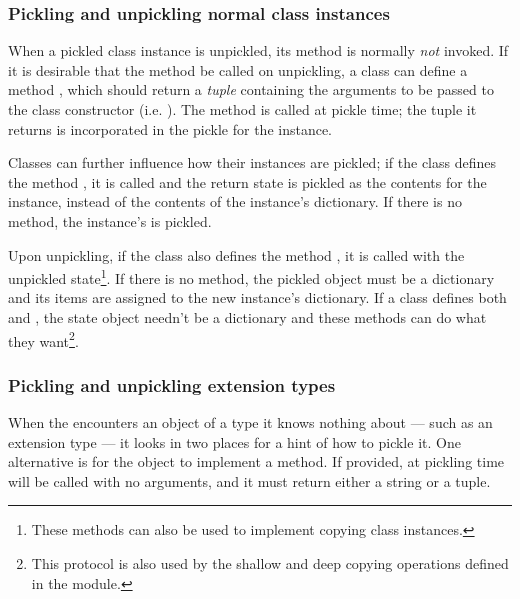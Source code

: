 \subsubsection{Pickling and unpickling normal class
    instances\label{pickle-inst}}

When a pickled class instance is unpickled, its 
method is normally \emph{not} invoked.  If it is desirable that the
 method be called on unpickling, a class can define
a method , which should return a
\emph{tuple} containing the arguments to be passed to the class
constructor (i.e. ).  The
 method is called at
pickle time; the tuple it returns is incorporated in the pickle for
the instance.


Classes can further influence how their instances are pickled; if the
class defines the method , it is called and the
return state is pickled as the contents for the instance, instead of
the contents of the instance's dictionary.  If there is no
 method, the instance's  is
pickled.

Upon unpickling, if the class also defines the method
, it is called with the unpickled
state\footnote{These methods can also be used to implement copying
class instances.}.  If there is no  method, the
pickled object must be a dictionary and its items are assigned to the
new instance's dictionary.  If a class defines both
 and , the state object
needn't be a dictionary and these methods can do what they
want\footnote{This protocol is also used by the shallow and deep
copying operations defined in the
 module.}.

\subsubsection{Pickling and unpickling extension types}

When the  encounters an object of a type it knows
nothing about --- such as an extension type --- it looks in two places
for a hint of how to pickle it.  One alternative is for the object to
implement a  method.  If provided, at pickling
time  will be called with no arguments, and it
must return either a string or a tuple.

